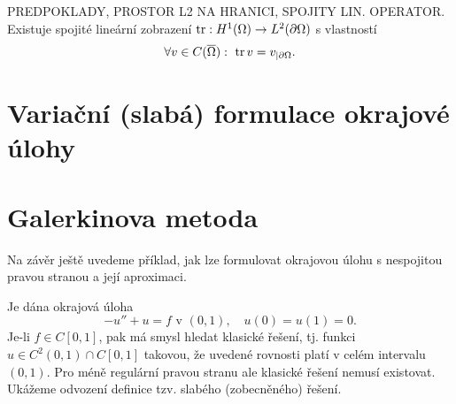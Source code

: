 \begin{veta}
PREDPOKLADY, PROSTOR L2 NA HRANICI, SPOJITY LIN. OPERATOR.
Existuje spojité lineární zobrazení $\operatorname{tr}:H^1(\Omega)\rightarrow L^2(\partial\Omega)$ s vlastností
\[ \forall v\in C(\overline\Omega):~ \operatorname{tr} v = v_{|\partial\Omega}. \]
\end{veta}







% 
% 


\section{Variační (slabá) formulace okrajové úlohy}

\section{Galerkinova metoda}

Na závěr ještě uvedeme příklad, jak lze formulovat okrajovou úlohu s nespojitou pravou stranou a její aproximaci.

Je dána okrajová úloha
\[ -u''+u=f \mbox{ v }(0,1),\quad u(0)=u(1)=0. \]
Je-li $f\in C[0,1]$, pak má smysl hledat klasické řešení, tj. funkci $u\in C^2(0,1)\cap C[0,1]$ takovou, že uvedené rovnosti platí v celém intervalu $(0,1)$.
Pro méně regulární pravou stranu ale klasické řešení nemusí existovat.
Ukážeme odvození definice tzv. slabého (zobecněného) řešení.

